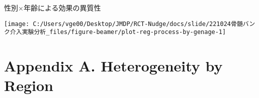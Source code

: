 \documentclass[
      aspectratio=169,
        12pt,
    ]{beamer}
\begin{document}
\begin{frame}{性別×年齢による効果の異質性}
\protect\hypertarget{ux6027ux5225ux5e74ux9f62ux306bux3088ux308bux52b9ux679cux306eux7570ux8ceaux6027-1}{}
\begin{center}\texttt{[image: C:/Users/vge00/Desktop/JMDP/RCT-Nudge/docs/slide/221024骨髄バンク介入実験分析\_files/figure-beamer/plot-reg-process-by-genage-1]} \end{center}
\end{frame}

\hypertarget{appendix-a.-heterogeneity-by-region}{%
\section{Appendix A. Heterogeneity by Region}\label{appendix-a.-heterogeneity-by-region}}
\end{document}
